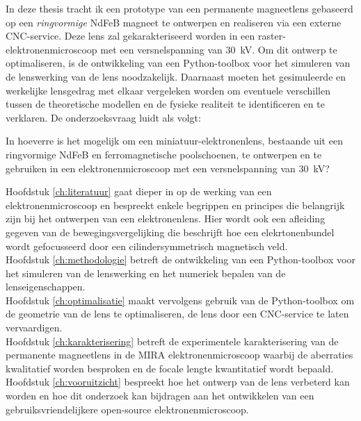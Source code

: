 \documentclass[we,twoside,openright,a4paper,11pt]{uantwerpenbamathesis}
\begin{document}
In deze thesis tracht ik een prototype van een permanente magneetlens gebaseerd op een \textit{ringvormige} NdFeB magneet te ontwerpen en realiseren via een externe CNC-service. Deze lens zal gekarakteriseerd worden in een raster-elektronenmicroscoop met een versnelspanning van $30$~kV. Om dit ontwerp te optimaliseren, is de ontwikkeling van een Python-toolbox voor het simuleren van de lenswerking van de lens noodzakelijk. Daarnaast moeten het gesimuleerde en werkelijke lensgedrag met elkaar vergeleken worden om eventuele verschillen tussen de theoretische modellen en de fysieke realiteit te identificeren en te verklaren. De onderzoeksvraag luidt als volgt:
\vspace{5mm}
\begin{tcolorbox}[colback=gray!10!white,colframe=gray!75!black,sharp corners,title=Onderzoeksvraag]
    In hoeverre is het mogelijk om een miniatuur-elektronenlens, bestaande uit een ringvormige NdFeB en ferromagnetische poolschoenen, te ontwerpen en te gebruiken in een elektronenmicroscoop met een versnelspanning van $30$~kV?
\end{tcolorbox}
\vspace{5mm}

Hoofdstuk \ref{ch:literatuur} gaat dieper in op de werking van een elektronenmicroscoop en bespreekt enkele begrippen en principes die belangrijk zijn bij het ontwerpen van een elektronenlens. Hier wordt ook een afleiding gegeven van de bewegingsvergelijking die beschrijft hoe een elekrtonenbundel wordt gefocusseerd door een cilindersymmetrisch magnetisch veld.\\

Hoofdstuk \ref{ch:methodologie} betreft de ontwikkeling van een Python-toolbox voor het simuleren van de lenswerking en het numeriek bepalen van de lenseigenschappen.\\

Hoofdstuk \ref{ch:optimalisatie} maakt vervolgens gebruik van de Python-toolbox om de geometrie van de lens te optimaliseren, de lens door een CNC-service te laten vervaardigen.\\

Hoofdstuk \ref{ch:karakterisering} betreft de experimentele karakterisering van de permanente magneetlens in de MIRA elektronenmicroscoop waarbij de aberraties kwalitatief worden besproken en de focale lengte kwantitatief wordt bepaald.\\

Hoofdstuk \ref{ch:vooruitzicht} bespreekt hoe het ontwerp van de lens verbeterd kan worden en hoe dit onderzoek kan bijdragen aan het ontwikkelen van een gebruiksvriendelijkere open-source elektronenmicroscoop.\\
\end{document}
